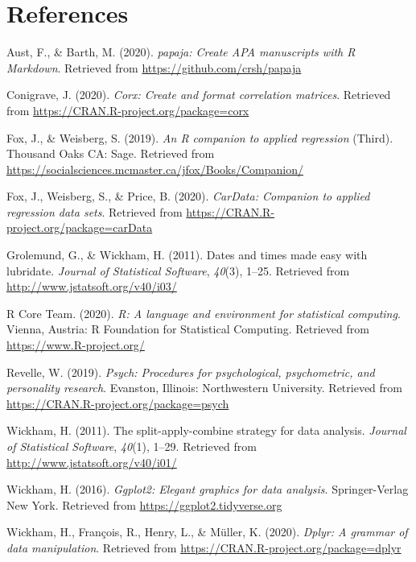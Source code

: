 \documentclass[
  english,
  man,floatsintext]{apa6}
\begin{document}
\hypertarget{references}{%
\section{References}\label{references}}

\begingroup
\setlength{\parindent}{-0.5in}
\setlength{\leftskip}{0.5in}

\hypertarget{refs}{}
\leavevmode\hypertarget{ref-R-papaja}{}%
Aust, F., \& Barth, M. (2020). \emph{papaja: Create APA manuscripts with R Markdown}. Retrieved from \url{https://github.com/crsh/papaja}

\leavevmode\hypertarget{ref-R-corx}{}%
Conigrave, J. (2020). \emph{Corx: Create and format correlation matrices}. Retrieved from \url{https://CRAN.R-project.org/package=corx}

\leavevmode\hypertarget{ref-R-car}{}%
Fox, J., \& Weisberg, S. (2019). \emph{An R companion to applied regression} (Third). Thousand Oaks CA: Sage. Retrieved from \url{https://socialsciences.mcmaster.ca/jfox/Books/Companion/}

\leavevmode\hypertarget{ref-R-carData}{}%
Fox, J., Weisberg, S., \& Price, B. (2020). \emph{CarData: Companion to applied regression data sets}. Retrieved from \url{https://CRAN.R-project.org/package=carData}

\leavevmode\hypertarget{ref-R-lubridate}{}%
Grolemund, G., \& Wickham, H. (2011). Dates and times made easy with lubridate. \emph{Journal of Statistical Software}, \emph{40}(3), 1--25. Retrieved from \url{http://www.jstatsoft.org/v40/i03/}

\leavevmode\hypertarget{ref-R-base}{}%
R Core Team. (2020). \emph{R: A language and environment for statistical computing}. Vienna, Austria: R Foundation for Statistical Computing. Retrieved from \url{https://www.R-project.org/}

\leavevmode\hypertarget{ref-R-psych}{}%
Revelle, W. (2019). \emph{Psych: Procedures for psychological, psychometric, and personality research}. Evanston, Illinois: Northwestern University. Retrieved from \url{https://CRAN.R-project.org/package=psych}

\leavevmode\hypertarget{ref-R-plyr}{}%
Wickham, H. (2011). The split-apply-combine strategy for data analysis. \emph{Journal of Statistical Software}, \emph{40}(1), 1--29. Retrieved from \url{http://www.jstatsoft.org/v40/i01/}

\leavevmode\hypertarget{ref-R-ggplot2}{}%
Wickham, H. (2016). \emph{Ggplot2: Elegant graphics for data analysis}. Springer-Verlag New York. Retrieved from \url{https://ggplot2.tidyverse.org}

\leavevmode\hypertarget{ref-R-dplyr}{}%
Wickham, H., François, R., Henry, L., \& Müller, K. (2020). \emph{Dplyr: A grammar of data manipulation}. Retrieved from \url{https://CRAN.R-project.org/package=dplyr}

\endgroup
\end{document}
